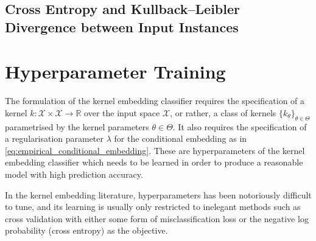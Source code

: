 \documentclass{article}
\begin{document}
	\subsection{Cross Entropy and Kullback–Leibler Divergence between Input Instances}

\section{Hyperparameter Training}
\label{sec:hyperparameter_learning}

	The formulation of the kernel embedding classifier requires the specification of a kernel $k : \mathcal{X} \times \mathcal{X} \to \mathbb{R}$ over the input space $\mathcal{X}$, or rather, a class of kernels $\{k_{\theta}\}_{\theta \in \Theta}$ parametrised by the kernel parameters $\theta \in \Theta$. It also requires the specification of a regularisation parameter $\lambda$ for the conditional embedding as in \eqref{eq:empirical_conditional_embedding}. These are hyperparameters of the kernel embedding classifier which needs to be learned in order to produce a reasonable model with high prediction accuracy. 

	In the kernel embedding literature, hyperparameters has been notoriously difficult to tune, and its learning is usually only restricted to inelegant methods such as cross validation with either some form of misclassification loss or the negative log probability (cross entropy) as the objective.

\end{document}
